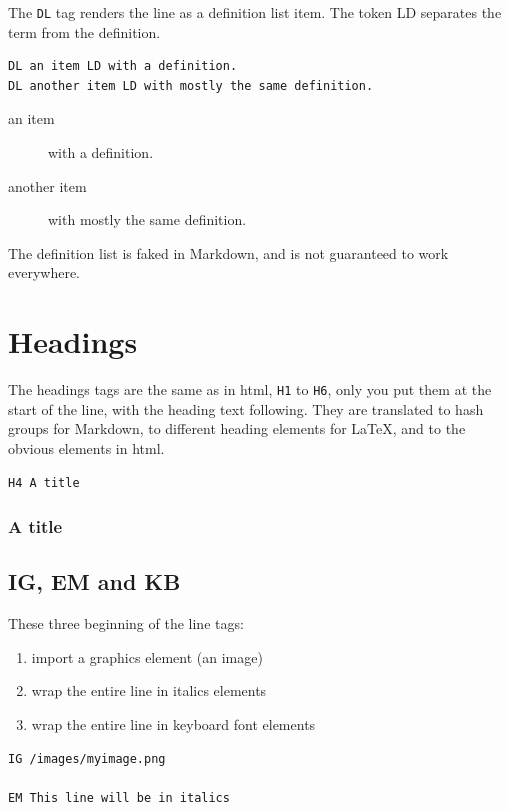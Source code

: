 \documentclass{report}
\begin{document}
The \texttt{DL} tag renders the line as a definition list item. The token LD separates the term from the definition.

\begin{verbatim}
DL an item LD with a definition.
DL another item LD with mostly the same definition.
\end{verbatim}

\begin{description}
\item[an item] with a definition.
\item[another item] with mostly the same definition.
\end{description}

The definition list is faked in Markdown, and is not guaranteed to work everywhere.

\chapter{Headings}
\label{headings}

The headings tags are the same as in html, \texttt{H1} to \texttt{H6}, only you put them at the start of the line, with the heading text following. They are translated to hash groups for Markdown, to different heading elements for \LaTeX{}, and to the obvious elements in html.

\begin{verbatim}
H4 A title
\end{verbatim}

\subsection{A title}
\label{a-title}

\section{IG, EM and KB}
\label{ig-em-and-kb}

These three beginning of the line tags:

\begin{enumerate}
\item import a graphics element (an image)
\item wrap the entire line in italics elements
\item wrap the entire line in keyboard font elements
\end{enumerate}

\begin{verbatim}
IG /images/myimage.png

EM This line will be in italics
\end{verbatim}
\end{document}
